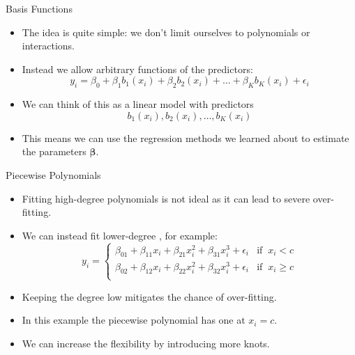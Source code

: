 \documentclass[mathserif, aspectratio=169]{beamer}
\begin{document}
\begin{frame}{Basis Functions}
	\begin{itemize}
		\item The idea is quite simple: we don't limit ourselves to polynomials or interactions.
		\item Instead we allow arbitrary functions of the predictors:
			\[
				y_i = 
				\beta_0 + \beta_1 b_1(x_i) + \beta_2 b_2(x_i) + \dots +
				\beta_K b_K(x_i) + \epsilon_i
			\]
		\item We can think of this as a linear model with predictors
			\[ b_1(x_i), b_2(x_i), \dots, b_K(x_i) \]
		\item This means we can use the regression methods we learned about to estimate
			the parameters $\bm{\beta}$.
	\end{itemize}
\end{frame}

\begin{frame}{Piecewise Polynomials}
	\begin{itemize}
		\item Fitting high-degree polynomials is not ideal as it can lead to severe over-fitting.
		\item We can instead fit lower-degree , for example:
			\[
				y_i =
				\begin{cases}
					\beta_{01} + \beta_{11} x_i + \beta_{21} x_i^2 + \beta_{31} x_i^3 + \epsilon_i &  \text{if} \;\; x_i < c \\
					\beta_{02} + \beta_{12} x_i + \beta_{22} x_i^2 + \beta_{32} x_i^3 + \epsilon_i &  \text{if} \;\; x_i \ge c \\
				\end{cases}
			\]
		\item Keeping the degree low mitigates the chance of over-fitting.
		\item In this example the piecewise polynomial has one  at 
			$x_i = c$.
		\item We can increase the flexibility by introducing more knots.
	\end{itemize}
\end{frame}
\end{document}
